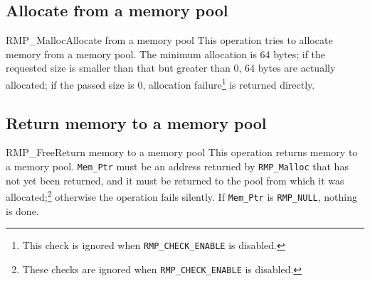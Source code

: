 \subsection{Allocate from a memory pool}
\begin{apidesc}{RMP\_Malloc}{Allocate from a memory pool}\label{api:RMP_Malloc}
    This operation tries to allocate memory from a memory pool.
    The minimum allocation is 64 bytes; if the requested size is smaller than that but greater than 0, 64 bytes are actually allocated; if the passed size is 0, allocation failure\footnote{This check is ignored when \texttt{RMP\_CHECK\_ENABLE} is disabled.} is returned directly.
    \begin{apiparams}
    \end{apiparams}
    \begin{apiret}
    \end{apiret}
\end{apidesc}

\subsection{Return memory to a memory pool}
\begin{apidesc}{RMP\_Free}{Return memory to a memory pool}\label{api:RMP_Free}
    This operation returns memory to a memory pool.
    \texttt{Mem\_Ptr} must be an
    address returned by \texttt{RMP\_Malloc} that has not yet been returned, and it
    must be returned to the pool from which it was allocated;\footnote{These checks are ignored when \texttt{RMP\_CHECK\_ENABLE} is disabled.} otherwise the operation fails silently.
    If \texttt{Mem\_Ptr} is \texttt{RMP\_NULL}, nothing is done.
    \begin{apiparams}
    \end{apiparams}
    \begin{apiret}
    \end{apiret}
\end{apidesc}

